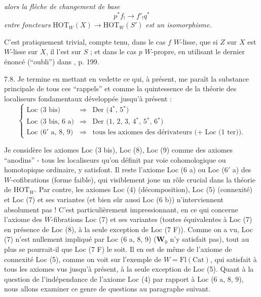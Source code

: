 \textit{alors la flèche de changement de base}
\[ p^*f_!\longrightarrow f'_!q^* \]
\textit{entre foncteurs} $\mathrm{HOT}_W(X)\longrightarrow\mathrm{HOT}_W(S')$ \textit{est un isomorphisme.}

C'est pratiquement trivial, compte tenu, dans le cas $f$ $W$-lisse, que si $Z$ sur $X$ est $W$-lisse sur $X$, il l'est sur $S$ ; et dans le cas $p$ $W$-propre, en utilisant le dernier énoncé (``oubli'') dans , p. 199.

7.8. Je termine en mettant en vedette ce qui, à présent, me paraît la substance principale de tous ces ``rappels'' et comme la quintessence de la théorie des localiseurs fondamentaux
développée jusqu'à présent :
\[ \left\{ \begin{array}{rcl}
\text{Loc (3 bis)} & \Longrightarrow & \text{Der (4$^*$, 5$^*$)}\\[1ex]
\text{Loc (3 bis, 6 a)} & \Longrightarrow & \text{Der (1, 2, 3, 4$^*$, 5$^*$, 6$^*$)}\\[1ex]
\text{Loc (6$'$ a, 8, 9)} & \Longrightarrow & \text{tous les axiomes des dérivateurs (+ Loc (1 ter)).}
\end{array} \right. \]

Je considère les axiomes Loc (3 bis), Loc (8), Loc (9) comme des axiomes ``anodins'' - tous les localiseurs qu'on définit par voie cohomologique ou homotopique ordinaire, y satisfont. Il reste l'axiome Loc (6 a) ou Loc (6$'$ a) des $W$-cofibrations (forme faible),
qui visiblement joue un rôle crucial dans la théorie de $\mathrm{HOT}_W$. Par contre, les axiomes Loc (4) (décomposition), Loc (5) (connexité) et Loc (7) et ses variantes (et bien sûr aussi Loc (6 b)) n'interviennent absolument pas ! C'est particulièrement impressionnant, en ce qui concerne l'axiome des $W$-fibrations Loc (7) et ses variantes (toutes équivalentes à Loc (7) en présence de Loc (8), à la seule exception de Loc (7 F)). Comme on a vu, Loc (7) n'est nullement impliqué par Loc (6 a, 8, 9) ($\mathbf{W}_0$ n'y satisfait pas), tout au plus se pourrait-il que Loc (7 F) le soit. Il en est de même de l'axiome de connexité Loc (5), comme on voit sur l'exemple de $W=\mathrm{Fl}(\mathrm{Cat})$, qui satisfait à tous les axiomes vus jusqu'à présent, à la seule exception
de Loc (5). Quant à la question de l'indépendance de l'axiome Loc (4) par rapport à Loc (6 a, 8, 9), nous allons examiner ce genre de questions au paragraphe suivant.

